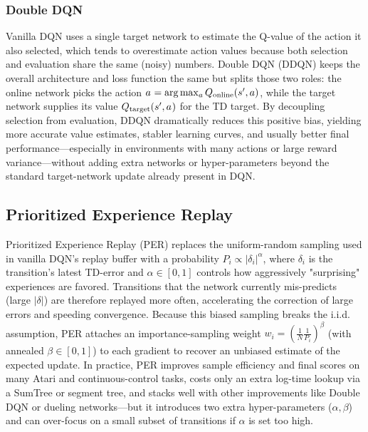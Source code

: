 \subsubsection{Double DQN}

Vanilla DQN uses a single target network to estimate the Q-value of the action it also selected, which tends to overestimate action values because both selection and evaluation share the same (noisy) numbers.
Double DQN (DDQN) keeps the overall architecture and loss function the same but splits those two roles: the online network picks the action \(a^{\*}=\arg\max_a Q_{\text{online}}(s',a)\), while the target network supplies its value \(Q_{\text{target}}(s',a^{\*})\) for the TD target.
By decoupling selection from evaluation, DDQN dramatically reduces this positive bias, yielding more accurate value estimates, stabler learning curves, and usually better final performance—especially in environments with many actions or large reward variance—without adding extra networks or hyper-parameters beyond the standard target-network update already present in DQN.

\subsection{Prioritized Experience Replay}

Prioritized Experience Replay (PER) replaces the uniform-random sampling used in vanilla DQN's replay buffer with a probability \(P_i \propto |\delta_i|^{\alpha}\), where \(\delta_i\) is the transition's latest TD-error and \(\alpha\in[0,1]\) controls how aggressively "surprising" experiences are favored.
Transitions that the network currently mis-predicts (large \(|\delta|\)) are therefore replayed more often, accelerating the correction of large errors and speeding convergence.
Because this biased sampling breaks the i.i.d. assumption, PER attaches an importance-sampling weight $w_i = (\frac{1}{N}\frac{1}{P_i})^{\beta}$ (with annealed \(\beta\in[0,1]\)) to each gradient to recover an unbiased estimate of the expected update.
In practice, PER improves sample efficiency and final scores on many Atari and continuous-control tasks, costs only an extra log-time lookup via a SumTree or segment tree, and stacks well with other improvements like Double DQN or dueling networks—but it introduces two extra hyper-parameters (\(\alpha, \beta\)) and can over-focus on a small subset of transitions if \(\alpha\) is set too high.


